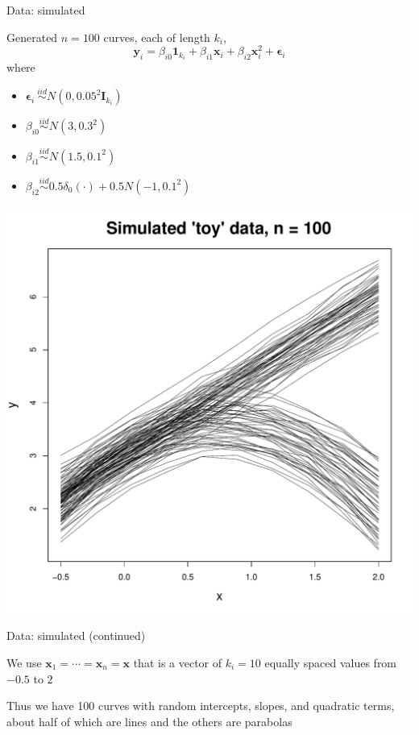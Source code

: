 \documentclass[serif, 12pt, t]{beamer}
\newcommand{\m}[1]{\mathbf{\bm{#1}}}
\renewcommand{\frametitle}[1]{\vspace{0.14cm}\hspace{-0.70cm}\textcolor{col2}{%
    \Large{#1}}\vspace{0.15cm}\newline}
\begin{document}
\begin{frame}
\frametitle{Data: simulated}

\begin{minipage}{0.60\textwidth}
Generated $n=100$ curves, each of length $k_i$,
\[ \m{y}_i = \beta_{i0}\m{1}_{k_i} + \beta_{i1}\m{x}_i + \beta_{i2}\m{x}_i^2 + \m{\epsilon}_i \]
where

\begin{itemize}[label=$\cdot$]
\item $\m{\epsilon}_i~ \overset{iid}\sim N(0, 0.05^2\m{I}_{k_i})$
\item $\beta_{i0} \overset{iid}\sim N(3, 0.3^2)$
\item $\beta_{i1} \overset{iid}\sim N(1.5, 0.1^2)$
\item $\beta_{i2} \overset{iid}\sim 0.5\delta_0(\cdot) + 0.5N(-1, 0.1^2)$
\end{itemize}

\end{minipage}
\begin{minipage}{0.35\textwidth}
\includegraphics[scale=0.25]{../figs/toy_data.pdf}
\end{minipage}

\end{frame}

\begin{frame}
\frametitle{Data: simulated (continued)}

We use $\m{x}_1=\cdots=\m{x}_n=\m{x}$ that is a vector of $k_i=10$ equally spaced values from $-0.5$ to $2$
\bigskip

Thus we have 100 curves with random intercepts, slopes, and quadratic terms, about half of which are lines and the others are parabolas
\end{frame}
\end{document}
